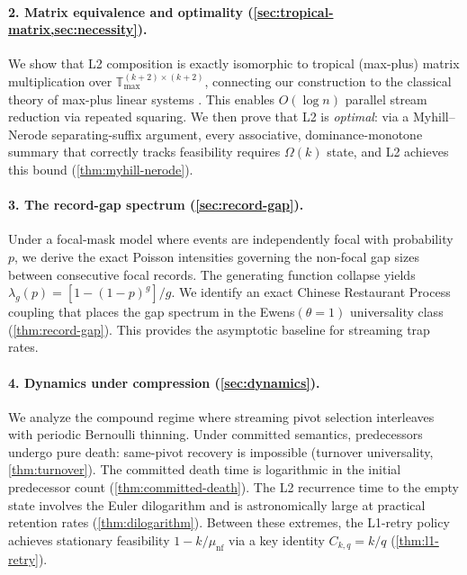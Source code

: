 \documentclass[11pt]{article}
\theoremstyle{plain}
\theoremstyle{definition}
\theoremstyle{remark}
\newcommand{\Tmax}{\mathbb{T}_{\max}}
\begin{document}
\paragraph{2. Matrix equivalence and optimality
(\cref{sec:tropical-matrix,sec:necessity}).}
We show that L2 composition is exactly isomorphic to tropical
(max-plus) matrix multiplication over
$\Tmax^{(k+2)\times(k+2)}$, connecting our construction to the
classical theory of max-plus linear systems
\cite{baccelli1992synchronization}.  This enables $O(\log n)$ parallel
stream reduction via repeated squaring.  We then prove that L2 is
\emph{optimal}: via a Myhill--Nerode separating-suffix argument, every
associative, dominance-monotone summary that correctly tracks
feasibility requires $\Omega(k)$ state, and L2 achieves this bound
(\cref{thm:myhill-nerode}).

\paragraph{3. The record-gap spectrum (\cref{sec:record-gap}).}
Under a focal-mask model where events are independently focal with
probability $p$, we derive the exact Poisson intensities governing the
non-focal gap sizes between consecutive focal records.  The generating
function collapse yields
$\lambda_g(p) = [1-(1-p)^g]/g$.
We identify an exact Chinese Restaurant Process coupling that places
the gap spectrum in the Ewens$(\theta=1)$ universality class
\cite{ewens1972sampling,arratia2003logarithmic,pitman2006combinatorial}
(\cref{thm:record-gap}).  This provides the asymptotic baseline for
streaming trap rates.

\paragraph{4. Dynamics under compression (\cref{sec:dynamics}).}
We analyze the compound regime where streaming pivot selection
interleaves with periodic Bernoulli thinning.  Under committed
semantics, predecessors undergo pure death: same-pivot recovery is
impossible (turnover universality, \cref{thm:turnover}).  The committed
death time is logarithmic in the initial predecessor count
(\cref{thm:committed-death}).  The L2 recurrence time to the empty
state involves the Euler dilogarithm and is astronomically large at
practical retention rates (\cref{thm:dilogarithm}).  Between these
extremes, the L1-retry policy achieves stationary feasibility
$1 - k/\mu_{\mathrm{nf}}$ via a key identity $C_{k,q} = k/q$
(\cref{thm:l1-retry}).
\end{document}
